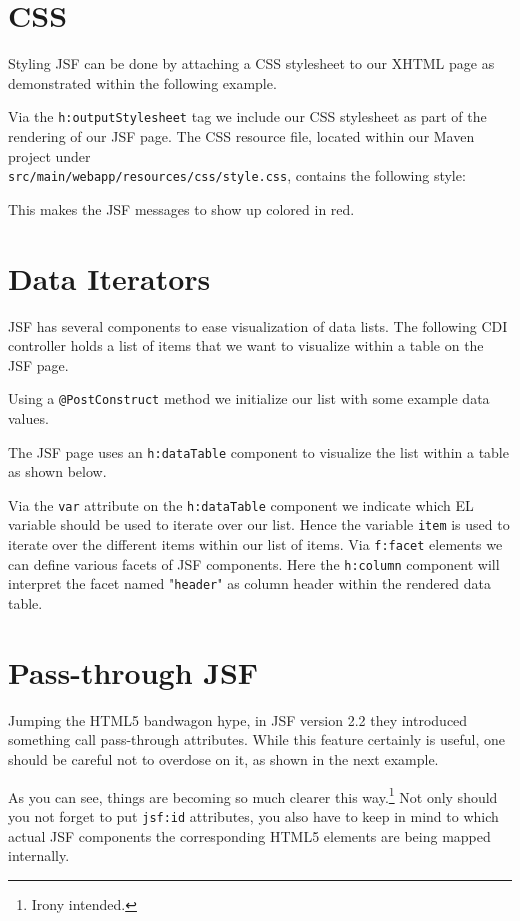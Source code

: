 \section{CSS}

Styling JSF can be done by attaching a CSS stylesheet to our XHTML page as demonstrated within the following example.

Via the \texttt{h:outputStylesheet} tag we include our CSS stylesheet as part of the rendering of our JSF page.
The CSS resource file, located within our Maven project under\\
\texttt{src/main/webapp/resources/css/style.css}, contains the following style:

This makes the JSF messages to show up colored in red.

\section{Data Iterators}

JSF has several components to ease visualization of data lists.
The following CDI controller holds a list of items that we want to visualize within a table on the JSF page.

Using a \texttt{@PostConstruct} method we initialize our list with some example data values.

The JSF page uses an \texttt{h:dataTable} component to visualize the list within a table as shown below.

Via the \texttt{var} attribute on the \texttt{h:dataTable} component we indicate which EL variable should be used to iterate over our list.
Hence the variable \texttt{item} is used to iterate over the different items within our list of items.
Via \texttt{f:facet} elements we can define various facets of JSF components.
Here the \texttt{h:column} component will interpret the facet named "\texttt{header}" as column header within the rendered data table.

\section{Pass-through JSF}
Jumping the HTML5 bandwagon hype, in JSF version 2.2 they introduced something call pass-through attributes.
While this feature certainly is useful, one should be careful not to overdose on it, as shown in the next example.

As you can see, things are becoming so much clearer this way.\footnote{Irony intended.}
Not only should you not forget to put \texttt{jsf:id} attributes,
you also have to keep in mind to which actual JSF components the corresponding HTML5 elements are being mapped internally.

